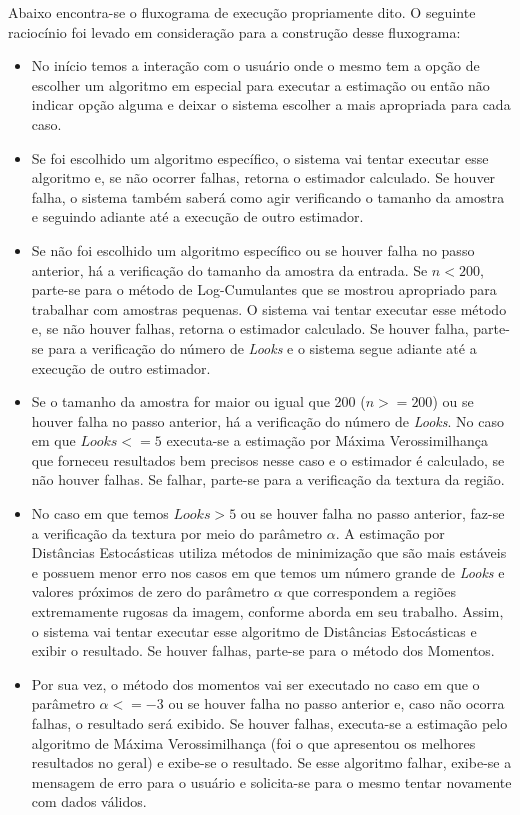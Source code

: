 \documentclass[11pt]{article}
\begin{document}
Abaixo encontra-se o fluxograma de execução propriamente dito. O seguinte raciocínio foi levado em consideração para a construção desse fluxograma:
\begin{itemize}
    \item No início temos a interação com o usuário onde o mesmo tem a opção de escolher um algoritmo em especial para executar a estimação ou então não indicar opção alguma e deixar o sistema escolher a mais apropriada para cada caso.
    \item Se foi escolhido um algoritmo específico, o sistema vai tentar executar esse algoritmo e, se não ocorrer falhas, retorna o estimador calculado. Se houver falha, o sistema também saberá como agir verificando o tamanho da amostra e seguindo adiante até a execução de outro estimador.
    \item Se não foi escolhido um algoritmo específico ou se houver falha no passo anterior, há a verificação do tamanho da amostra da entrada. Se $n < 200$, parte-se para o método de Log-Cumulantes que se mostrou apropriado para trabalhar com amostras pequenas. O sistema vai tentar executar esse método e, se não houver falhas, retorna o estimador calculado. Se houver falha, parte-se para a verificação do número de \textit{Looks} e o sistema segue adiante até a execução de outro estimador.
    \item Se o tamanho da amostra for maior ou igual que 200 ($n >= 200$) ou se houver falha no passo anterior, há a verificação do número de \textit{Looks}. No caso em que $Looks <= 5$ executa-se a estimação por Máxima Verossimilhança que forneceu resultados bem precisos nesse caso e o estimador é calculado, se não houver falhas. Se falhar, parte-se para a verificação da textura da região.
    \item No caso em que temos $Looks > 5$ ou se houver falha no passo anterior, faz-se a verificação da textura por meio do parâmetro $\alpha$. A estimação por Distâncias Estocásticas utiliza métodos de minimização que são mais estáveis e possuem menor erro nos casos em que temos um número grande de \textit{Looks} e valores próximos de zero do parâmetro $\alpha$ que correspondem a regiões extremamente rugosas da imagem, conforme aborda \citet{Cassetti2013} em seu trabalho. Assim, o sistema vai tentar executar esse algoritmo de Distâncias Estocásticas e exibir o resultado. Se houver falhas, parte-se para o método dos Momentos. 
    \item Por sua vez, o método dos momentos vai ser executado no caso em que o parâmetro $\alpha <= -3$ ou se houver falha no passo anterior e, caso não ocorra falhas, o resultado será exibido. Se houver falhas, executa-se a estimação pelo algoritmo de Máxima Verossimilhança (foi o que apresentou os melhores resultados no geral) e exibe-se o resultado. Se esse algoritmo falhar, exibe-se a mensagem de erro para o usuário e solicita-se para o mesmo tentar novamente com dados válidos.
    
\end{itemize}
\end{document}
